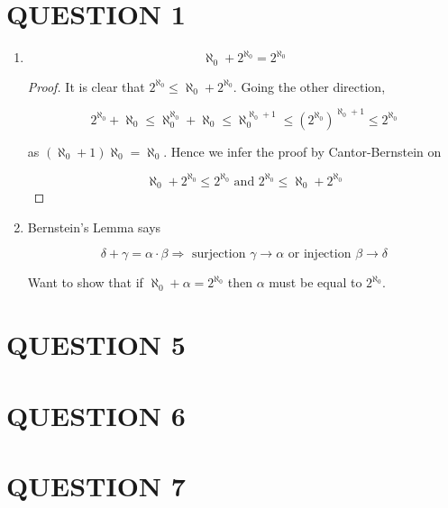 \documentclass[a4paper]{article}
\begin{document}
	
\maketitle

\section{QUESTION 1}
\begin{enumerate}
	\item 
	\begin{prop} 
		\[ \aleph_{0} + 2^{\aleph_{0}} = 2^{\aleph_{0}} \]
	\end{prop}

\begin{proof}
	It is clear that $ 2^{\aleph_{0}} \leq \aleph_{0} + 2^{\aleph_{0}} $.
	Going the other direction,
	
	\[ 2^{\aleph_{0}} + \aleph_{0} \leq \aleph_{0}^{\aleph_{0}} + \aleph_{0} \leq \aleph_{0}^{\aleph_{0} + 1} \leq (2^{\aleph_{0}})^{\aleph_{0} + 1} \leq 2^{\aleph_{0}}  \]
	
	as $ (\aleph_{0} + 1)\aleph_{0} = \aleph_{0} $. Hence we infer the proof by Cantor-Bernstein on
	
	\[  \aleph_{0} + 2^{\aleph_{0}} \leq 2^{\aleph_{0}} \text{ and } 2^{\aleph_{0}} \leq \aleph_{0} + 2^{\aleph_{0}}  \]
	
	
\end{proof}
\item Bernstein's Lemma says 

\[ \delta + \gamma = \alpha \cdot \beta \Rightarrow \text{ surjection } \gamma \to \alpha \text{ or injection } \beta \to \delta \]


Want to show that if $ \aleph_{0} + \alpha = 2^{\aleph_{0}} $ then $ \alpha $ must be equal to $ 2^{\aleph_{0}} $.

\end{enumerate}





\section{QUESTION 5}
\section{QUESTION 6}
\section{QUESTION 7}
\end{document}
